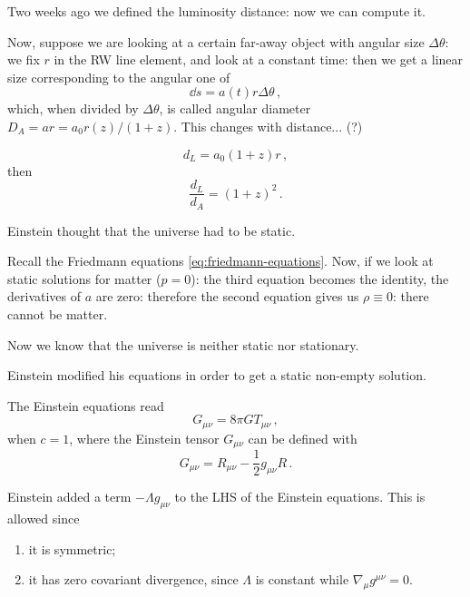 \documentclass[main.tex]{subfiles}
\begin{document}
Two weeks ago we defined the luminosity distance: now we can compute it.


Now,  suppose we are looking at a certain far-away object with angular size \(\Delta \theta \): we fix \(r\) in the RW line element, and look at a constant time: then we get a linear size corresponding to the angular one of 
%
\begin{equation}
  \dd{s}  = a(t) r \Delta \theta 
\,,
\end{equation}
%
which, when divided by \(\Delta \theta \), is called angular diameter \(D_A = a r = a_0 r(z) / (1+z)\).
This changes with distance... (?) 

\begin{equation}
 d_L = a_0 (1+z) r
\,,
\end{equation}
%
then 
%
\begin{equation}
  \frac{d_L}{d_A} = (1+z)^2
\,.
\end{equation}

Einstein thought that the universe had to be static.

Recall the Friedmann equations \eqref{eq:friedmann-equations}. Now, if we look at static solutions for matter (\(p=0\)): the third equation becomes the identity, the derivatives of \(a\) are zero: therefore the second equation gives us \(\rho \equiv 0\): there cannot be matter.

Now we know that the universe is neither static nor stationary.

Einstein modified his equations in order to get a static non-empty solution.

The Einstein equations read 
%
\begin{equation}
  G_{\mu \nu } = 8 \pi G T_{\mu \nu }
\,,
\end{equation}
%
when \(c=1\), where the Einstein tensor \(G_{\mu \nu }\) can be defined with 
%
\begin{equation}
  G_{ \mu \nu } = R_{\mu \nu } - \frac{1}{2} g_{\mu \nu }R
\,.
\end{equation}

Einstein added a term \(- \Lambda g_{\mu \nu }\) to the LHS of the Einstein equations. This is allowed since 

\begin{enumerate}
    \item it is symmetric;
    \item it has zero covariant divergence, since \(\Lambda \) is constant while \(\nabla_{\mu } g^{\mu \nu } = 0\).
\end{enumerate}
\end{document}
